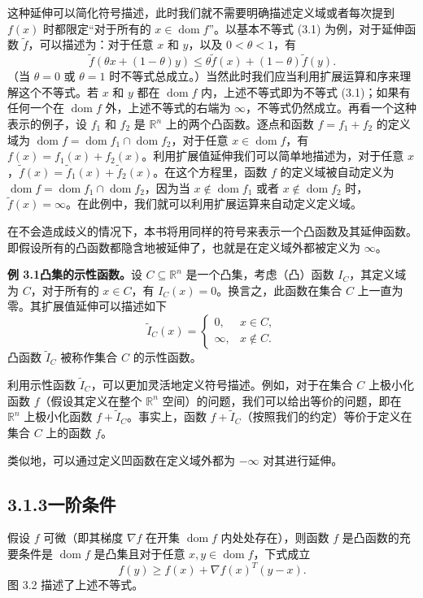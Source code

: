 \documentclass[UTF8,12pt,a4paper,fontset=fandol]{ctexart}
\DeclareMathOperator{\dom}{dom}
\begin{document}
这种延伸可以简化符号描述，此时我们就不需要明确描述定义域或者每次提到 $f(x)$ 时都限定“对于所有的 $x\in\dom f$”。以基本不等式 (3.1) 为例，对于延伸函数 $\tilde f$，可以描述为：对于任意 $x$ 和 $y$，以及 $0<\theta<1$，有
\[
\tilde f(\theta x+(1-\theta)y)\leq \theta \tilde f(x)+(1-\theta)\tilde f(y).
\]
（当 $\theta=0$ 或 $\theta=1$ 时不等式总成立。）当然此时我们应当利用扩展运算和序来理解这个不等式。若 $x$ 和 $y$ 都在 $\dom f$ 内，上述不等式即为不等式 (3.1)；如果有任何一个在 $\dom f$ 外，上述不等式的右端为 $\infty$，不等式仍然成立。再看一个这种表示的例子，设 $f_1$ 和 $f_2$ 是 $\mathbb{R}^n$ 上的两个凸函数。逐点和函数 $f=f_1+f_2$ 的定义域为 $\dom f=\dom f_1\cap\dom f_2$，对于任意 $x\in\dom f$，有 $f(x)=f_1(x)+f_2(x)$。利用扩展值延伸我们可以简单地描述为，对于任意 $x$，$\tilde f(x)=\tilde f_1(x)+\tilde f_2(x)$。在这个方程里，函数 $f$ 的定义域被自动定义为 $\dom f=\dom f_1\cap\dom f_2$，因为当 $x\notin\dom f_1$ 或者 $x\notin\dom f_2$ 时，$\tilde f(x)=\infty$。在此例中，我们就可以利用扩展运算来自动定义定义域。

在不会造成歧义的情况下，本书将用同样的符号来表示一个凸函数及其延伸函数。即假设所有的凸函数都隐含地被延伸了，也就是在定义域外都被定义为 $\infty$。

\noindent\textbf{例 3.1\quad 凸集的示性函数。}\quad 设 $C\subseteq\mathbb{R}^n$ 是一个凸集，考虑（凸）函数 $I_C$，其定义域为 $C$，对于所有的 $x\in C$，有 $I_C(x)=0$。换言之，此函数在集合 $C$ 上一直为零。其扩展值延伸可以描述如下
\[
\tilde I_C(x)=
\begin{cases}
0, & x\in C,\\
\infty, & x\notin C.
\end{cases}
\]
凸函数 $\tilde I_C$ 被称作集合 $C$ 的示性函数。

利用示性函数 $\tilde I_C$，可以更加灵活地定义符号描述。例如，对于在集合 $C$ 上极小化函数 $f$（假设其定义在整个 $\mathbb{R}^n$ 空间）的问题，我们可以给出等价的问题，即在 $\mathbb{R}^n$ 上极小化函数 $f+\tilde I_C$。事实上，函数 $f+\tilde I_C$（按照我们的约定）等价于定义在集合 $C$ 上的函数 $f$。

类似地，可以通过定义凹函数在定义域外都为 $-\infty$ 对其进行延伸。

\subsection*{3.1.3\quad 一阶条件}

假设 $f$ 可微（即其梯度 $\nabla f$ 在开集 $\dom f$ 内处处存在），则函数 $f$ 是凸函数的充要条件是 $\dom f$ 是凸集且对于任意 $x,y\in\dom f$，下式成立
\begin{equation}
f(y)\geq f(x)+\nabla f(x)^T(y-x).
\tag{3.2}
\end{equation}
图 3.2 描述了上述不等式。
\end{document}
